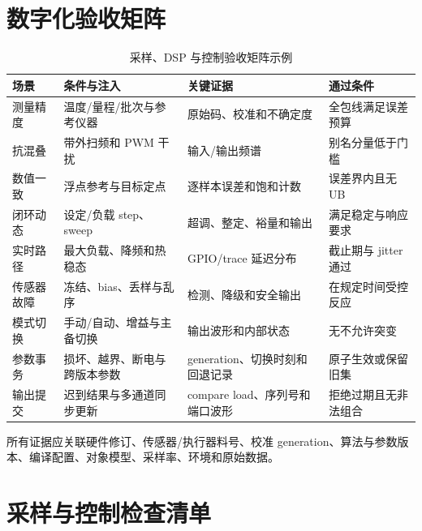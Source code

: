 \section{数字化验收矩阵}

\begin{table}[H]
  \centering
  \caption{采样、DSP 与控制验收矩阵示例}
  \begin{tabular}{p{28mm}p{41mm}p{39mm}p{32mm}}
    \hline
    场景 & 条件与注入 & 关键证据 & 通过条件 \\
    \hline
    测量精度 & 温度/量程/批次与参考仪器 & 原始码、校准和不确定度 & 全包线满足误差预算 \\
    抗混叠 & 带外扫频和 PWM 干扰 & 输入/输出频谱 & 别名分量低于门槛 \\
    数值一致 & 浮点参考与目标定点 & 逐样本误差和饱和计数 & 误差界内且无 UB \\
    闭环动态 & 设定/负载 step、sweep & 超调、整定、裕量和输出 & 满足稳定与响应要求 \\
    实时路径 & 最大负载、降频和热稳态 & GPIO/trace 延迟分布 & 截止期与 jitter 通过 \\
    传感器故障 & 冻结、bias、丢样与乱序 & 检测、降级和安全输出 & 在规定时间受控反应 \\
    模式切换 & 手动/自动、增益与主备切换 & 输出波形和内部状态 & 无不允许突变 \\
    参数事务 & 损坏、越界、断电与跨版本参数 & generation、切换时刻和回退记录 & 原子生效或保留旧集 \\
    输出提交 & 迟到结果与多通道同步更新 & compare load、序列号和端口波形 & 拒绝过期且无非法组合 \\
    \hline
  \end{tabular}
\end{table}

所有证据应关联硬件修订、传感器/执行器料号、校准 generation、算法与参数版本、编译配置、对象模型、采样率、环境和原始数据。

\newpage
\section{采样与控制检查清单}

